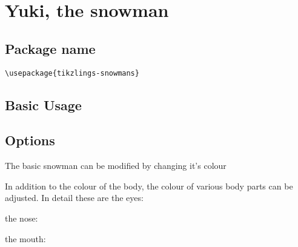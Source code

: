 \documentclass[parskip=half]{scrartcl}
\begin{document}
\begin{tcblisting}{}
\penguin[3D]
\end{tcblisting}



\clearpage
\section[Snowman]{Yuki, the snowman}

\subsection{Package name}

\begin{tcolorbox}[lower separated=false, lefthand width=.8\linewidth]
\vspace*{0.5cm}
\lstinline|\usepackage{tikzlings-snowmans}|
\vspace*{0.5cm}
\end{tcolorbox}

\subsection{Basic Usage}

\begin{tcblisting}{}
\snowman
\end{tcblisting}

\subsection{Options}

The basic snowman can be modified by changing it's colour

\begin{tcblisting}{}
\snowman[body=SteelBlue]
\end{tcblisting}

In addition to the colour of the body, the colour of various body parts can be adjusted. In detail these are the eyes:

\begin{tcblisting}{}
\snowman[eye=red]
\end{tcblisting}

the nose:

\begin{tcblisting}{}
\snowman[nose=red]
\end{tcblisting}

the mouth:
\end{document}
